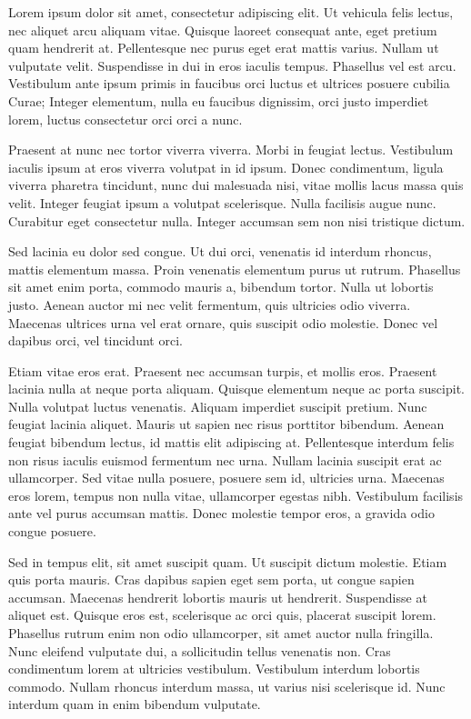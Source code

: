 Lorem ipsum dolor sit amet, consectetur adipiscing elit. Ut vehicula felis lectus, nec aliquet arcu aliquam vitae. Quisque laoreet consequat ante, eget pretium quam hendrerit at. Pellentesque nec purus eget erat mattis varius. Nullam ut vulputate velit. Suspendisse in dui in eros iaculis tempus. Phasellus vel est arcu. Vestibulum ante ipsum primis in faucibus orci luctus et ultrices posuere cubilia Curae; Integer elementum, nulla eu faucibus dignissim, orci justo imperdiet lorem, luctus consectetur orci orci a nunc.

Praesent at nunc nec tortor viverra viverra. Morbi in feugiat lectus. Vestibulum iaculis ipsum at eros viverra volutpat in id ipsum. Donec condimentum, ligula viverra pharetra tincidunt, nunc dui malesuada nisi, vitae mollis lacus massa quis velit. Integer feugiat ipsum a volutpat scelerisque. Nulla facilisis augue nunc. Curabitur eget consectetur nulla. Integer accumsan sem non nisi tristique dictum.

Sed lacinia eu dolor sed congue. Ut dui orci, venenatis id interdum rhoncus, mattis elementum massa. Proin venenatis elementum purus ut rutrum. Phasellus sit amet enim porta, commodo mauris a, bibendum tortor. Nulla ut lobortis justo. Aenean auctor mi nec velit fermentum, quis ultricies odio viverra. Maecenas ultrices urna vel erat ornare, quis suscipit odio molestie. Donec vel dapibus orci, vel tincidunt orci.

Etiam vitae eros erat. Praesent nec accumsan turpis, et mollis eros. Praesent lacinia nulla at neque porta aliquam. Quisque elementum neque ac porta suscipit. Nulla volutpat luctus venenatis. Aliquam imperdiet suscipit pretium. Nunc feugiat lacinia aliquet. Mauris ut sapien nec risus porttitor bibendum. Aenean feugiat bibendum lectus, id mattis elit adipiscing at. Pellentesque interdum felis non risus iaculis euismod fermentum nec urna. Nullam lacinia suscipit erat ac ullamcorper. Sed vitae nulla posuere, posuere sem id, ultricies urna. Maecenas eros lorem, tempus non nulla vitae, ullamcorper egestas nibh. Vestibulum facilisis ante vel purus accumsan mattis. Donec molestie tempor eros, a gravida odio congue posuere.

Sed in tempus elit, sit amet suscipit quam. Ut suscipit dictum molestie. Etiam quis porta mauris. Cras dapibus sapien eget sem porta, ut congue sapien accumsan. Maecenas hendrerit lobortis mauris ut hendrerit. Suspendisse at aliquet est. Quisque eros est, scelerisque ac orci quis, placerat suscipit lorem. Phasellus rutrum enim non odio ullamcorper, sit amet auctor nulla fringilla. Nunc eleifend vulputate dui, a sollicitudin tellus venenatis non. Cras condimentum lorem at ultricies vestibulum. Vestibulum interdum lobortis commodo. Nullam rhoncus interdum massa, ut varius nisi scelerisque id. Nunc interdum quam in enim bibendum vulputate.